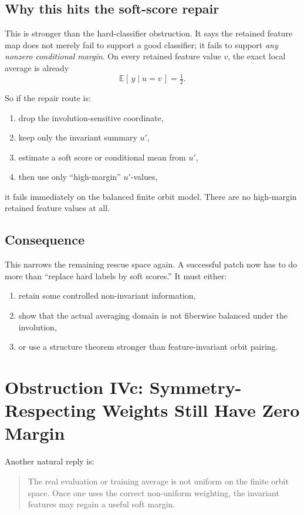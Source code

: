 \documentclass[11pt]{article}
\theoremstyle{remark}
\begin{document}
\subsection{Why this hits the soft-score repair}

This is stronger than the hard-classifier obstruction.  It says the retained feature map does not
merely fail to support a good classifier; it fails to support \emph{any nonzero conditional
margin}.  On every retained feature value \(v\), the exact local average is already
\[
  \mathbb{E}[\,y \mid u=v\,] = \tfrac12.
\]

So if the repair route is:
\begin{enumerate}[leftmargin=1.5em]
  \item drop the involution-sensitive coordinate,
  \item keep only the invariant summary \(u'\),
  \item estimate a soft score or conditional mean from \(u'\),
  \item then use only ``high-margin'' \(u'\)-values,
\end{enumerate}
it fails immediately on the balanced finite orbit model.  There are no high-margin retained
feature values at all.

\subsection{Consequence}

This narrows the remaining rescue space again.  A successful patch now has to do more than
``replace hard labels by soft scores.''  It must either:
\begin{enumerate}[leftmargin=1.5em]
  \item retain some controlled non-invariant information,
  \item show that the actual averaging domain is not fiberwise balanced under the involution,
  \item or use a structure theorem stronger than feature-invariant orbit pairing.
\end{enumerate}

\section{Obstruction IVc: Symmetry-Respecting Weights Still Have Zero Margin}

Another natural reply is:
\begin{quote}
The real evaluation or training average is not uniform on the finite orbit space.  Once one uses
the correct non-uniform weighting, the invariant features may regain a useful soft margin.
\end{quote}
\end{document}

